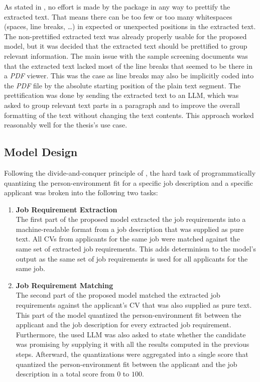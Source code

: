 \documentclass[draft,final]{thesisclass} %
\begin{document}
As stated in \textcite{pymupdf}, no effort is made by the package in any way to prettify the extracted text.
That means there can be too few or too many whitespaces (spaces, line breaks, \dots) in expected or unexpected positions in the extracted text.
The non-prettified extracted text was already properly usable for the proposed model, but it was decided that the extracted text should be prettified to group relevant information.
The main issue with the sample screening documents was that the extracted text lacked most of the line breaks that seemed to be there in a \textit{PDF} viewer.
This was the case as line breaks may also be implicitly coded into the \textit{PDF} file by the absolute starting position of the plain text segment.
The prettification was done by sending the extracted text to an \acs{LLM}, which was asked to group relevant text parts in a paragraph and to improve the overall formatting of the text without changing the text contents.
This approach worked reasonably well for the thesis's use case.

\subsection{Model Design}
Following the divide-and-conquer principle of \textcite{pj_fit_ml}, the hard task of programmatically quantizing the person-environment fit for a specific job description and a specific applicant was broken into the following two tasks:
\begin{enumerate}
    \item \textbf{Job Requirement Extraction}\\
    The first part of the proposed model extracted the job requirements into a machine-readable format from a job description that was supplied as pure text.
    All \acs{CV}s from applicants for the same job were matched against the same set of extracted job requirements.
    This adds determinism to the model's output as the same set of job requirements is used for all applicants for the same job.
    \item \textbf{Job Requirement Matching}\\
    The second part of the proposed model matched the extracted job requirements against the applicant's \acs{CV} that was also supplied as pure text.
    This part of the model quantized the person-environment fit between the applicant and the job description for every extracted job requirement.
    Furthermore, the used \acs{LLM} was also asked to state whether the candidate was promising by supplying it with all the results computed in the previous steps.
    Afterward, the quantizations were aggregated into a single score that quantized the person-environment fit between the applicant and the job description in a total score from $0$ to $100$.
\end{enumerate}
\end{document}
